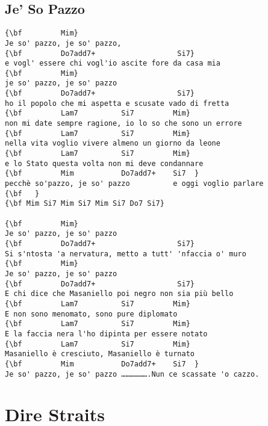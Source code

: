 \documentclass[a4paper]{article}
\begin{document}
\subsection{Je' So Pazzo} %
\label{sub:Je' So Pazzo}
\begin{Verbatim}[commandchars=\\\{\}]
{\bf         Mim}
Je so' pazzo, je so' pazzo,
{\bf         Do7add7+                   Si7}
e vogl' essere chi vogl'io ascite fore da casa mia
{\bf         Mim}
je so' pazzo, je so' pazzo
{\bf         Do7add7+                   Si7}
ho il popolo che mi aspetta e scusate vado di fretta
{\bf         Lam7          Si7         Mim}
non mi date sempre ragione, io lo so che sono un errore
{\bf         Lam7          Si7         Mim}
nella vita voglio vivere almeno un giorno da leone
{\bf         Lam7          Si7         Mim}
e lo Stato questa volta non mi deve condannare
{\bf         Mim           Do7add7+    Si7  }
pecchè so'pazzo, je so' pazzo          e oggi voglio parlare
{\bf   }
{\bf Mim Si7 Mim Si7 Mim Si7 Do7 Si7}

{\bf         Mim}
Je so' pazzo, je so' pazzo
{\bf         Do7add7+                   Si7}
Si s'ntosta 'a nervatura, metto a tutt' 'nfaccia o' muro
{\bf         Mim}
Je so' pazzo, je so' pazzo
{\bf         Do7add7+                   Si7}
E chi dice che Masaniello poi negro non sia più bello
{\bf         Lam7          Si7         Mim}
E non sono menomato, sono pure diplomato
{\bf         Lam7          Si7         Mim}
E la faccia nera l'ho dipinta per essere notato
{\bf         Lam7          Si7         Mim}
Masaniello è cresciuto, Masaniello è turnato
{\bf         Mim           Do7add7+    Si7  }
Je so' pazzo, je so' pazzo ……………….Nun ce scassate 'o cazzo.
\end{Verbatim}
\newpage
\section{Dire Straits} %
\label{sec:Dire Straits}
\end{document}
